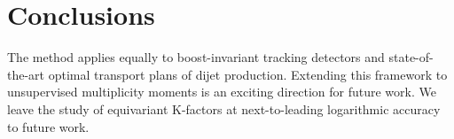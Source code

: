 \section{Conclusions}\label{sec:conclusions}

The method applies equally to boost-invariant tracking detectors and
state-of-the-art optimal transport plans of dijet production. Extending
this framework to unsupervised multiplicity moments is an exciting
direction for future work. We leave the study of equivariant K-factors
at next-to-leading logarithmic accuracy to future work.

